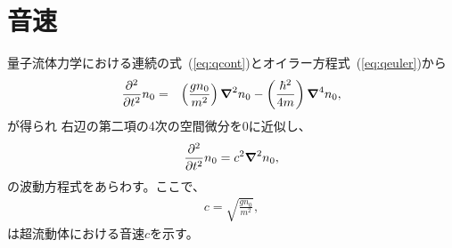 \documentclass[12pt,a4paper]{jbook}
\def\Vec#1{\mbox{\boldmath $#1$}}			%
\begin{document}
        \section{音速}
        量子流体力学における連続の式~(\ref{eq:qcont})とオイラー方程式~(\ref{eq:qeuler})から
        \begin{eqnarray}
            \frac{\partial^2}{\partial t^2}n_0
            & = & \left( \frac{g n_0}{m^2} \right) \Vec{\nabla}^2 n_0
            - \left( \frac{\hbar^2}{4m} \right) \Vec{\nabla}^4 n_0,
        \end{eqnarray}
        が得られ
        右辺の第二項の4次の空間微分を$0$に近似し、
        \begin{eqnarray}
            \frac{\partial^2}{\partial t^2} n_0 = c^2 \Vec{\nabla}^2 n_0,
        \end{eqnarray}
        の波動方程式をあらわす。ここで、
        \begin{eqnarray}
            c = \sqrt{\frac{g n_0}{m^2}},
        \end{eqnarray}
		は超流動体における音速$c$を示す。
\end{document}
